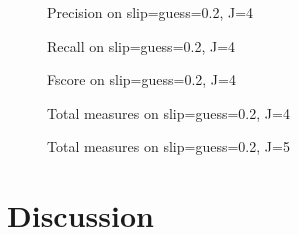 \documentclass{edm_template-no-copyright}
\begin{document}
\begin{figure}[h!]
  \begin{center}
  
  \end{center}
  \caption{Precision on slip=guess=0.2, J=4}  
  \label{fig:theta02J4Precision}
\end{figure}

\begin{figure}[h!]
  \begin{center}
  
  \end{center}
  \caption{Recall on slip=guess=0.2, J=4}  
  \label{fig:theta02J4Recall}
\end{figure}

\begin{figure}[h!]
  \begin{center}
  
  \end{center}
  \caption{Fscore on slip=guess=0.2, J=4}  
  \label{fig:theta02J4Fscore}
\end{figure}

\begin{figure}[h!]
  \begin{center}
  
  \end{center}
  \caption{Total measures on slip=guess=0.2, J=4}  
  \label{fig:theta02J4test}
\end{figure}

\begin{figure}[h!]
  \begin{center}
  
  \end{center}
  \caption{Total measures on slip=guess=0.2, J=5}  
  \label{fig:theta02J5test}
\end{figure}


%  

\section{Discussion}



\end{document}
